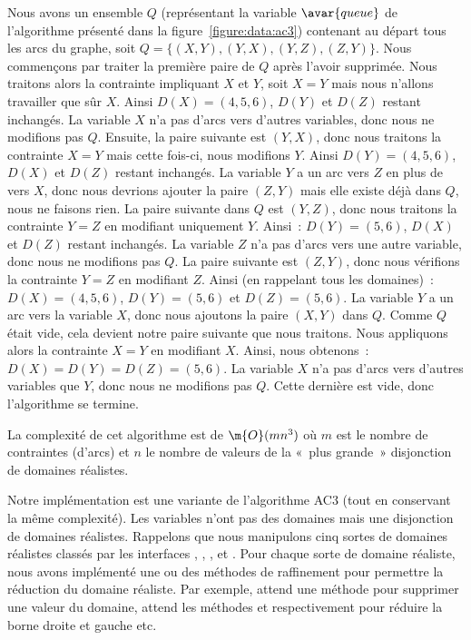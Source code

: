 \begin{example}
Nous avons un ensemble $Q$ (représentant la variable $\avar{queue}$ de
l'algorithme présenté dans la figure~\ref{figure:data:ac3}) contenant au départ
tous les arcs du graphe, soit $Q = \{(X, Y), (Y, X), (Y, Z), (Z, Y)\}$. Nous
commençons par traiter la première paire de $Q$ après l'avoir supprimée. Nous
traitons alors la contrainte impliquant $X$ et $Y$, soit $X = Y$ mais nous
n'allons travailler que sûr $X$. Ainsi $D(X) = (4, 5, 6)$, $D(Y)$ et $D(Z)$
restant inchangés. La variable $X$ n'a pas d'arcs vers d'autres variables, donc
nous ne modifions pas $Q$. Ensuite, la paire suivante est $(Y, X)$, donc nous
traitons la contrainte $X = Y$ mais cette fois-ci, nous modifions $Y$. Ainsi
$D(Y) = (4, 5, 6)$, $D(X)$ et $D(Z)$ restant inchangés. La variable $Y$ a un arc
vers $Z$ en plus de vers $X$, donc nous devrions ajouter la paire $(Z, Y)$ mais
elle existe déjà dans $Q$, nous ne faisons rien. La paire suivante dans $Q$ est
$(Y, Z)$, donc nous traitons la contrainte $Y = Z$ en modifiant uniquement $Y$.
Ainsi~: $D(Y) = (5, 6)$, $D(X)$ et $D(Z)$ restant inchangés. La variable $Z$ n'a
pas d'arcs vers une autre variable, donc nous ne modifions pas $Q$. La paire
suivante est $(Z, Y)$, donc nous vérifions la contrainte $Y = Z$ en modifiant
$Z$. Ainsi (en rappelant tous les domaines)~: $D(X) = (4, 5, 6)$, $D(Y) = (5,
6)$ et $D(Z) = (5, 6)$. La variable $Y$ a un arc vers la variable $X$, donc nous
ajoutons la paire $(X, Y)$ dans $Q$. Comme $Q$ était vide, cela devient notre
paire suivante que nous traitons. Nous appliquons alors la contrainte $X = Y$ en
modifiant $X$. Ainsi, nous obtenons~: $D(X) = D(Y) = D(Z) = (5, 6)$. La variable
$X$ n'a pas d'arcs vers d'autres variables que $Y$, donc nous ne modifions pas
$Q$.  Cette dernière est vide, donc l'algorithme se termine.

\end{example}

La complexité de cet algorithme est de $\m{O}(mn^3)$ où $m$ est le nombre de
contraintes (d'arcs) et $n$ le nombre de valeurs de la «~plus grande~»
disjonction de domaines réalistes.

Notre implémentation est une variante de l'algorithme AC3 (tout en conservant la
même complexité). Les variables n'ont pas des domaines mais une disjonction de
domaines réalistes. Rappelons que nous manipulons cinq sortes de domaines
réalistes classés par les interfaces , ,
,  et . Pour chaque sorte de
domaine réaliste, nous avons implémenté une ou des méthodes de raffinement pour
permettre la réduction du domaine réaliste. Par exemple,  attend
une méthode  pour supprimer une valeur du domaine,
 attend les méthodes  et 
respectivement pour réduire la borne droite et gauche etc.


